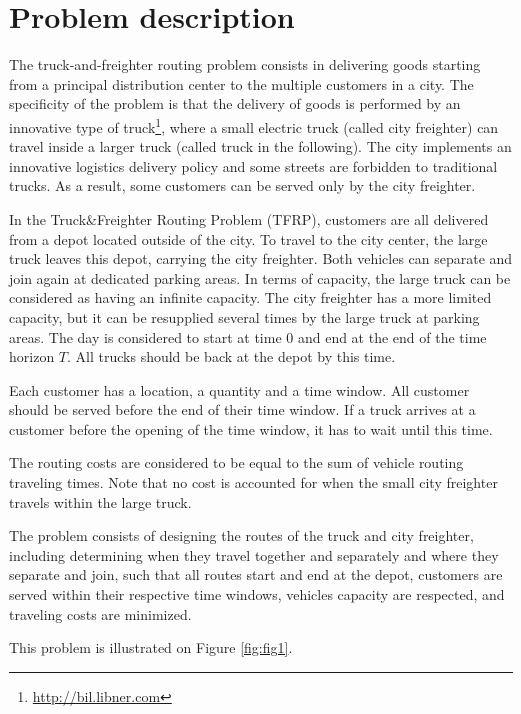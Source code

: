 \documentclass[dvipsnames,authoryear,11pt]{article}
\begin{document}
\section{Problem description}

The truck-and-freighter routing problem consists in delivering goods starting from a principal distribution center to the multiple customers in a city. The specificity of the problem is that the delivery of goods is performed by an innovative type of truck\footnote{\url{http://bil.libner.com}}, where a small electric truck (called city freighter) can travel inside a larger truck (called truck in the following). The city implements an innovative logistics delivery policy and some streets are forbidden to traditional trucks. 
As a result, some customers can be served only by the city freighter. 

In the Truck\&Freighter Routing Problem (TFRP), customers are all delivered from a depot located outside of the city.
To travel to the city center, the large truck leaves this depot, carrying the city freighter. 
Both vehicles can separate and join again at dedicated parking areas. In terms of capacity, the large truck can be considered as having an infinite capacity. The city freighter has a more limited capacity, but it can be resupplied several times by the large truck at parking areas. The day is considered to start at time $0$ and end at the end of the time horizon $T$. All trucks should be back at the depot by this time.

Each customer has a location, a quantity and a time window. All customer should be served before the end of their time window. 
If a truck arrives at a customer before the opening of the time window, it has to wait until this time. 

The routing costs are considered to be equal to the sum of vehicle routing traveling times. 
Note that no cost is accounted for when the small city freighter travels within the large truck. 

The problem consists of designing the routes of the truck and city freighter, including determining when they travel together and separately and where they separate and join, such that all routes start and end at the depot, customers are served within their respective time windows, vehicles capacity are respected, and traveling costs are minimized. 

This problem is illustrated on Figure \ref{fig:fig1}.
\end{document}
